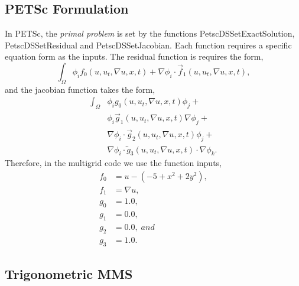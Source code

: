 \subsection{PETSc Formulation}

In PETSc, the \textit{primal problem} is set by the functions PetscDSSetExactSolution, PetscDSSetResidual and PetscDSSetJacobian.  Each function requires a specific equation form as the inputs.  The residual function is requires the form,
\begin{equation}
\int_\Omega \phi_i f_0(u, u_t, \nabla u, x, t) + \nabla\phi_i \cdot {\vec f}_1(u, u_t, \nabla u, x, t),
\end{equation}
and the jacobian function takes the form,
\begin{equation}
\begin{split}
\int_\Omega &\phi_i g_0(u, u_t, \nabla u, x, t) \phi_j + \\
&\phi_i {\vec g}_1(u, u_t, \nabla u, x, t) \nabla \phi_j + \\
&\nabla\phi_i \cdot {\vec g}_2(u, u_t, \nabla u, x, t) \phi_j + \\
&\nabla\phi_i \cdot {\overleftrightarrow g}_3(u, u_t, \nabla u, x, t) \cdot \nabla \phi_k.
\end{split}
\end{equation}
Therefore, in the multigrid code we use the function inputs,
\begin{align}
f_0 &= u - (-5 + x^2 + 2 y^2), \\
f_1 &= \nabla u, \\
g_0 &= 1.0, \\
g_1 &= 0.0, \\
g_2 &= 0.0,\; and \\
g_3 &= 1.0.
\end{align}

\subsection{Trigonometric MMS}


